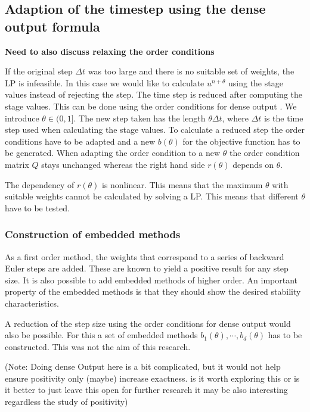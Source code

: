 \documentclass[a4paper]{article}
\numberwithin{equation}{section}
\theoremstyle{plain}
\theoremstyle{definition}
\numberwithin{theorem}{section}
\newcommand{\dt}{{\Delta t}}
\newcommand{\1}{\mathbbm{1}}
\begin{document}
\subsection{Adaption of the timestep using the dense output formula}

{\bf Need to also discuss relaxing the order conditions}

If the original step $\dt$ was too large and there is no suitable set of weights, the LP is infeasible. In this case we would like to calculate $u^{n+\theta}$ using the stage values instead of rejecting the step. The time step is reduced after computing the stage values. This can be done using the order conditions for dense output \cite[Section~II.6]{hairer_solving_1993}.
We introduce $\theta \in (0,1]$. The new step taken has the length $\theta \dt$, where $\dt$ is the time step used when calculating the stage values.
To calculate a reduced step the order conditions have to be adapted and a new $b(\theta)$ for the objective function has to be generated. 
When adapting the order condition to a new $\theta$ the order condition matrix $Q$ stays unchanged whereas the right hand side $r(\theta)$ depends on $\theta$.

The dependency of $r(\theta)$ is nonlinear. This means that the maximum $\theta$ with suitable weights cannot be calculated by solving a LP. This means that different $\theta$ have to be tested. 

\subsubsection{Construction of embedded methods}

As a first order method, the weights that correspond to a series of backward Euler steps are added. These are known to yield a positive result for any step size.
It is also possible to add embedded methods of higher order.
An important property of the embedded methods is that they should show the desired stability characteristics. 

A reduction of the step size using the order conditions for dense output would also be possible. For this a set of embedded methods $b_1(\theta),\cdots,b_d(\theta)$ has to be constructed. This was not the aim of this research.

(Note: Doing dense Output here is a bit complicated, but it would not help ensure positivity only (maybe) increase exactness.  is it worth exploring this or is it better to just leave this open for further research it may be also interesting regardless the study of positivity)
\end{document}

